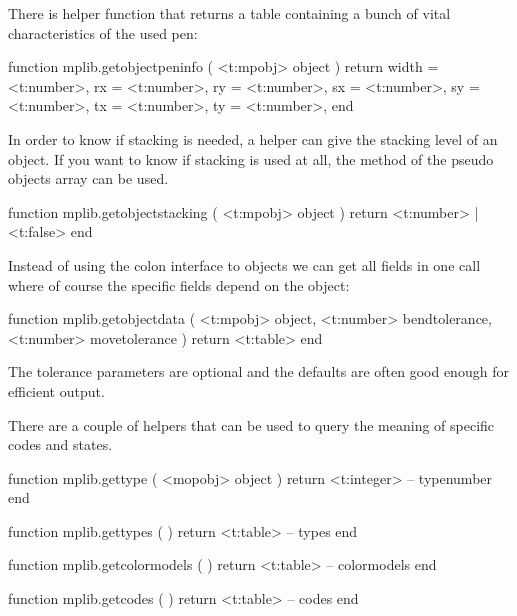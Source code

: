 There is helper function  that returns a table containing
a bunch of vital characteristics of the used pen:

\starttyping[option=LUA]
function mplib.getobjectpeninfo ( <t:mpobj> object )
    return {
        width = <t:number>,
        rx    = <t:number>,
        ry    = <t:number>,
        sx    = <t:number>,
        sy    = <t:number>,
        tx    = <t:number>,
        ty    = <t:number>,
    }
end
\stoptyping

In order to know if stacking is needed, a helper can give the stacking level of
an object. If you want to know if stacking is used at all, the 
method of the pseudo objects array can be used.

\starttyping[option=LUA]
function mplib.getobjectstacking ( <t:mpobj> object )
    return <t:number> | <t:false>
end
\stoptyping

Instead of using the colon interface to objects we can get all fields in one call
where of course the specific fields depend on the object:

\starttyping[option=LUA]
function mplib.getobjectdata (
    <t:mpobj> object,
    <t:number> bendtolerance,
    <t:number> movetolerance
)
    return <t:table>
end
\stoptyping

The tolerance parameters are optional and the defaults are often good enough for
efficient output.

\stopsection

\startsection[title=Internals]

There are a couple of helpers that can be used to query the meaning of specific
codes and states.

\starttyping[option=LUA]
function mplib.gettype ( <mopobj> object )
    return <t:integer> -- typenumber
end
\stoptyping

\starttyping[option=LUA]
function mplib.gettypes ( )
    return <t:table> -- types
end
\stoptyping

\startfourrows
\stopfourrows

\starttyping[option=LUA]
function mplib.getcolormodels ( )
    return <t:table> -- colormodels
end
\stoptyping

\startfourrows
\stopfourrows

\starttyping[option=LUA]
function mplib.getcodes ( )
    return <t:table> -- codes
end
\stoptyping

\startfourrows
\stopfourrows

